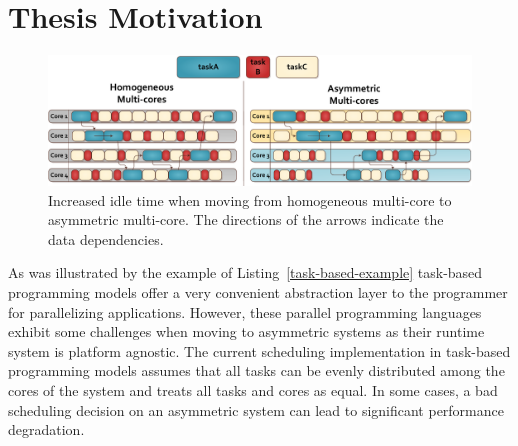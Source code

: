 \section{Thesis Motivation}
\begin{figure}[t]%
	\centering
	\includegraphics[width=\textwidth]{figures/thesis_motivation.pdf}
	\caption{Increased idle time when moving from homogeneous multi-core to asymmetric multi-core. The directions of the arrows indicate the data dependencies.}
	\label{fig:thesis_motivation}
\end{figure}

As was illustrated by the example of Listing~\ref{task-based-example} task-based programming models offer a very convenient abstraction layer to the programmer for parallelizing applications.
However, these parallel programming languages exhibit some challenges when moving to asymmetric systems as their runtime system is platform agnostic.
The current scheduling implementation in task-based programming models assumes that all tasks can be evenly distributed among the cores of the system and treats all tasks and cores as equal.
In some cases, a bad scheduling decision on an asymmetric system can lead to significant performance degradation. 

